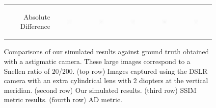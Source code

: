 \begin{figure}[!bht]
\begin{tabular}{@{}r@{ } c@{ } c@{ } c@{ } c@{ } c }
	\begin{sideways} \parbox[b]{20mm} {Absolute Difference} \end{sideways} &
	\includegraphics[width=0.185\textwidth]{../../__Images/05/BW_20-200_+2@90/bw_N_20-200_Camera+2,00D@90(diff).png} &
	\includegraphics[width=0.185\textwidth]{../../__Images/05/BW_20-200_+2@90/bw_C_20-200_Camera+2,00D@90(diff).png} &
	\includegraphics[width=0.185\textwidth]{../../__Images/05/BW_20-200_+2@90/bw_K_20-200_Camera+2,00D@90(diff).png} &
	\includegraphics[width=0.185\textwidth]{../../__Images/05/BW_20-200_+2@90/bw_Z_20-200_Camera+2,00D@90(diff).png} &
	\includegraphics[width=0.185\textwidth]{../../__Images/05/BW_20-200_+2@90/bw_O_20-200_Camera+2,00D@90(diff).png} \\

	\end{tabular}
	
	\caption{Comparisons of our simulated results against ground truth obtained with a astigmatic camera. These large images correspond to a Snellen ratio of 20/200. (top row) Images captured using the DSLR camera with an extra cylindrical lens with 2 diopters at the vertical meridian. (second row) Our simulated results. (third row) SSIM metric results. (fourth row) AD metric.}
	\label{fig:astig}
\end{figure}

